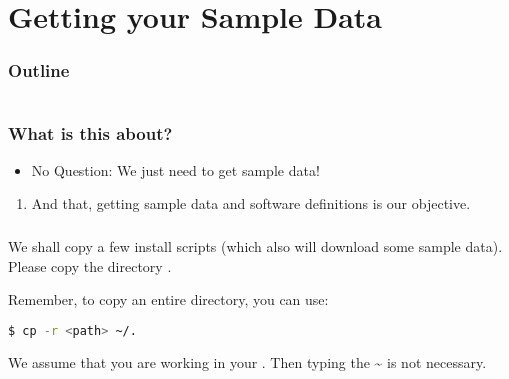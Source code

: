 \section{Getting your Sample Data}

\begin{frame}
	\frametitle{Outline}
	\begin{columns}[t]
		\begin{column}{.5\textwidth}
			\tableofcontents[sections={1-9},currentsection]
		\end{column}
		\begin{column}{.5\textwidth}
			\tableofcontents[sections={10-18},currentsection]
		\end{column}
	\end{columns}
\end{frame}

\begin{frame}
	\frametitle{What is this about?}
	\begin{question}[Questions]\begin{itemize}
			\item No Question: We just need to get sample data!
		\end{itemize}
	\end{question}
	\begin{docs}[Objectives]
		\begin{enumerate}
			\item And that, getting sample data and software definitions is our objective.
		\end{enumerate}
	\end{docs}
\end{frame}

\begin{frame}[fragile]
  \frametitle{}
  We shall copy a few install scripts (which also will download some sample data).\newline
  Please copy the directory .\newline
  \begin{hint}
  	Remember, to copy an entire directory, you can use:
  	\begin{lstlisting}[language=Bash, style=Shell]
$ cp -r <path> ~/.
  	\end{lstlisting}
    We assume that you are working in your . Then typing the \textasciitilde{} is not necessary.
  \end{hint}  
\end{frame}

